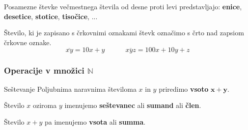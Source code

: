 \begin{frame}
            \begin{block}{}
                Posamezne števke večmestnega števila od desne proti levi predstavljajo: \textbf{enice}, \textbf{desetice}, \textbf{stotice}, \textbf{tisočice}, ...
            \end{block}

            \begin{block}{}
                Število, ki je zapisano s črkovnimi oznakami števk označimo s črto nad zapsiom črkovne oznake.
                $$ \overline{xy}=10x+y \quad \quad \quad \overline{xyz}=100x+10y+z$$
            \end{block}

            
        \end{frame}

        \begin{frame}
            \frametitle{Operacije v množici $\mathbb{N}$}

            \begin{alertblock}{Seštevanje}
                Poljubnima naravnima številoma $x$ in $y$ priredimo \textbf{vsoto} $\mathbf{x+y}$.
            \end{alertblock}

            \begin{block}{}
                Število $x$ oziroma $y$ imenujemo \textbf{seštevanec} ali \textbf{sumand} ali \textbf{člen}. 

                Število $x+y$ pa imenujemo \textbf{vsota} ali \textbf{summa}. 

            \begin{figure}
\end{figure}
\end{block}
\end{frame}
